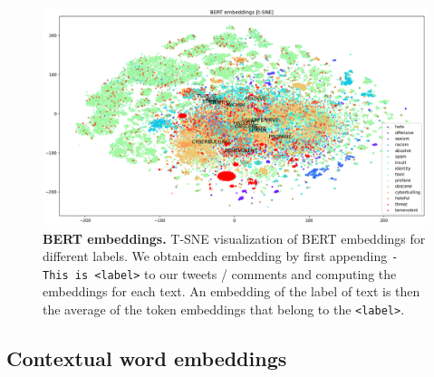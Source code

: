 \documentclass[fleqn,moreauthors,10pt]{ds_report}
\begin{document}
\begin{figure}[htb]\centering
	\includegraphics[width=\linewidth]{bert_tsne.png}
	\caption{\textbf{BERT embeddings.} T-SNE visualization of BERT embeddings for different labels. We obtain each embedding by first appending \texttt{- This is <label>} to our tweets / comments and computing the embeddings for each text. An embedding of the label of text is then the average of the token embeddings that belong to the \texttt{<label>}.}
	\label{fig:berttsne}
\end{figure}

\subsection{Contextual word embeddings}

\end{document}
